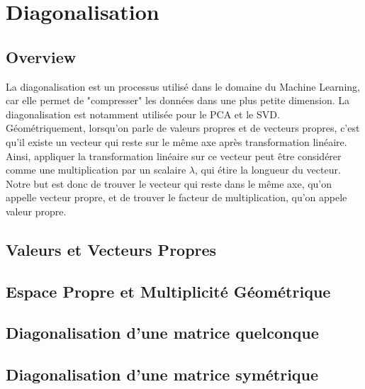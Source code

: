 \documentclass{article}
\begin{document}
\begin{intuition}

\end{intuition}

\begin{remark}

\end{remark}


\begin{problem}

\end{problem}

\pagebreak

\section{Diagonalisation}

\subsection{Overview}

La diagonalisation est un processus utilisé dans le domaine du Machine Learning,
car elle permet de "compresser" les données dans une plus petite dimension. La
diagonalisation est notamment utilisée pour le PCA et le SVD.\\

Géométriquement, lorsqu'on parle de valeurs propres et de vecteurs propres, c'est
qu'il existe un vecteur qui reste sur le même axe après transformation linéaire.
Ainsi, appliquer la transformation linéaire sur ce vecteur peut être considérer
comme une multiplication par un scalaire $\lambda$, qui étire la longueur du vecteur.
Notre but est donc de trouver le vecteur qui reste dans le même axe, qu'on appelle
vecteur propre, et de trouver le facteur de multiplication, qu'on appele valeur
propre.

\subsection{Valeurs et Vecteurs Propres}

\subsection{Espace Propre et Multiplicité Géométrique}

\subsection{Diagonalisation d'une matrice quelconque}

\subsection{Diagonalisation d'une matrice symétrique}

\pagebreak
\end{document}
